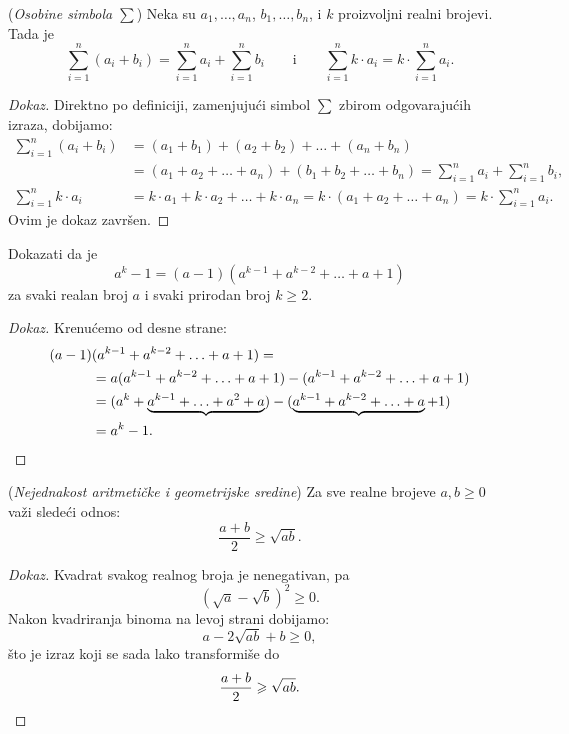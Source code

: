 \begin{EX} (\emph{Osobine simbola $\sum$})
  Neka su $a_1, \ldots, a_n$, $b_1, \ldots, b_n$, i $k$ proizvoljni realni brojevi. Tada je
  $$
    \sum_{i=1}^n (a_i + b_i) = \sum_{i=1}^n a_i + \sum_{i=1}^n b_i \qquad \text{i} \qquad
    \sum_{i=1}^n k \cdot a_i = k \cdot \sum_{i=1}^n a_i.
  $$
\end{EX}
\begin{proof}[Dokaz]
  Direktno po definiciji, zamenjuju\'ci simbol $\sum$ zbirom odgovaraju\'cih izraza, dobijamo:
  \begin{align*}
    \sum_{i=1}^n (a_i + b_i) &= (a_1 + b_1) + (a_2 + b_2) + \ldots + (a_n + b_n)\\
                             &= (a_1 + a_2 + \ldots + a_n) + (b_1 + b_2 + \ldots + b_n) = \sum_{i=1}^n a_i + \sum_{i=1}^n b_i,\\
    \sum_{i=1}^n k\cdot a_i &= k\cdot a_1 + k \cdot a_2 + \ldots + k \cdot a_n
                            = k \cdot (a_1 + a_2 + \ldots + a_n) = k \cdot \sum_{i=1}^n a_i.
  \end{align*}
  Ovim je dokaz zavr\v sen.
\end{proof}
 
\begin{EX}\label{ft05.ex.ak-1}
  Dokazati da je
  $$
    a^k - 1 = (a - 1)(a^{k-1} + a^{k-2} + \ldots + a + 1)
  $$
  za svaki realan broj $a$ i svaki prirodan broj $k \ge 2$.
 \end{EX}
 \begin{proof}[Dokaz]
  Krenu\'cemo od desne strane:
  \begin{align*}
    (a - 1)&(a^{k-1} + a^{k-2} + \ldots + a + 1) =\\
          &= a(a^{k-1} + a^{k-2} + \ldots + a + 1) - (a^{k-1} + a^{k-2} + \ldots + a + 1)\\
          &= (a^{k} + \underbrace{a^{k-1} + \ldots + a^2 + a}) - (\underbrace{a^{k-1} + a^{k-2} + \ldots + a} + 1)\\
          &= a^k - 1.\qedhere
  \end{align*}
 \end{proof}
 
 
 \begin{EX}\label{ft05.ex.a-g-sredina} (\emph{Nejednakost aritmeti\v cke i geometrijske sredine})
  Za sve realne brojeve $a, b \ge 0$ va\v zi slede\'ci odnos:
  $$
    \frac{a + b}{2} \ge \sqrt{ab}.
  $$
 \end{EX}
 \begin{proof}[Dokaz]
  Kvadrat svakog realnog broja je nenegativan, pa
  $$
    (\sqrt a - \sqrt b)^2 \ge 0.
  $$
  Nakon kvadriranja binoma na levoj strani dobijamo:
  $$
    a - 2 \sqrt{ab} + b \ge 0,
  $$
  \v sto je izraz koji se sada lako transformi\v se do
  $$
    \frac{a + b}{2} \ge \sqrt{ab}.\qedhere
  $$
 \end{proof}
 

